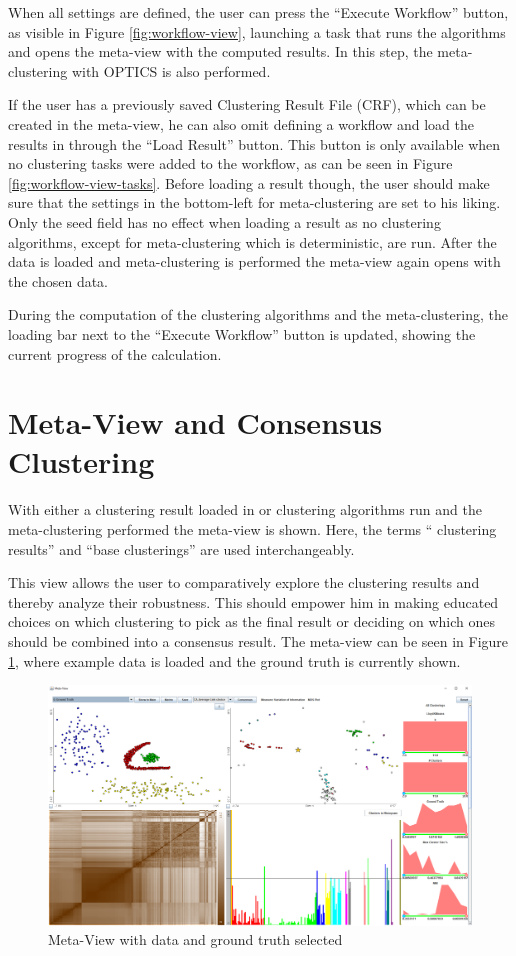 \documentclass[
	a4paper,
	english,
	twoside,
	openright,               
	11pt                            
	]{report}
\begin{document}
When all settings are defined, the user can press the ``Execute Workflow'' button, as visible in Figure \ref{fig:workflow-view}, launching a task that runs the algorithms and opens the meta-view with the computed results. In this step, the meta-clustering with OPTICS \cite{10.1145/304181.304187} is also performed.

If the user has a previously saved Clustering Result File (CRF), which can be created in the meta-view, he can also omit defining a workflow and load the results in through the ``Load Result'' button. This button is only available when no clustering tasks were added to the workflow, as can be seen in Figure \ref{fig:workflow-view-tasks}. Before loading a result though, the user should make sure that the settings in the bottom-left for meta-clustering are set to his liking. Only the seed field has no effect when loading a result as no clustering algorithms, except for meta-clustering which is deterministic, are run. After the data is loaded and meta-clustering is performed the meta-view again opens with the chosen data.

During the computation of the clustering algorithms and the meta-clustering, the loading bar next to the ``Execute Workflow'' button is updated, showing the current progress of the calculation.

\section{Meta-View and Consensus Clustering}
With either a clustering result loaded in or clustering algorithms run and the meta-clustering performed the meta-view is shown. Here, the terms `` clustering results'' and ``base clusterings'' are used interchangeably.

This view allows the user to comparatively explore the clustering results and thereby analyze their robustness. This should empower him in making educated choices on which clustering to pick as the final result or deciding on which ones should be combined into a consensus result. The meta-view can be seen in Figure \ref{fig:meta-view}, where example data is loaded and the ground truth is currently shown.

\begin{figure}[H]
	\centering
	\includegraphics[angle=-90,origin=c,scale=.42]{meta-view}
	\caption{Meta-View with data and ground truth selected}
	\label{fig:meta-view}
\end{figure}
\end{document}
